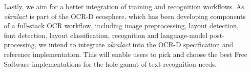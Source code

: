 \documentclass[conference]{IEEEtran}
\begin{document}



Lastly, we aim for a better integration of training and
recognition workflows. As \textit{okralact} is part of the OCR-D
ecosphere, which has been developing components of a full-stack
OCR workflow, including image preprocessing, layout detection, font
detection, layout classification, recognition and language-model
post-processing, we intend to integrate \textit{okralact} into the
OCR-D specification and reference implementation. This will enable
users to pick and choose the best Free Software implementations for
the hole gamut of text recognition needs.




%
%
%



\end{document}
